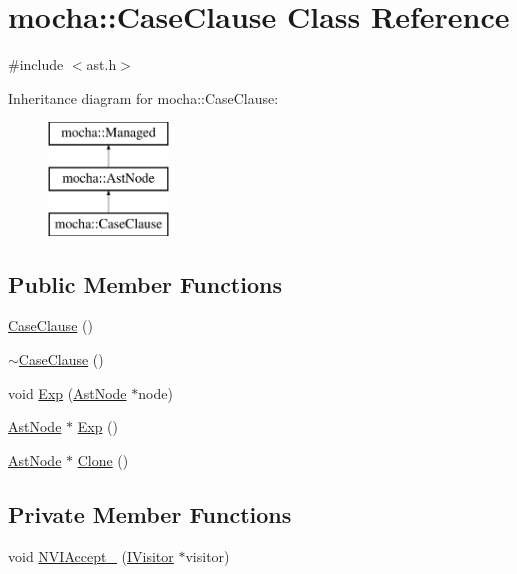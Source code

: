 \hypertarget{classmocha_1_1_case_clause}{
\section{mocha::CaseClause Class Reference}
\label{classmocha_1_1_case_clause}
}


{\ttfamily \#include $<$ast.h$>$}

Inheritance diagram for mocha::CaseClause:\begin{figure}[H]
\begin{center}
\leavevmode
\includegraphics[height=3.000000cm]{classmocha_1_1_case_clause}
\end{center}
\end{figure}
\subsection*{Public Member Functions}
\begin{DoxyCompactItemize}
\item 
\hyperlink{classmocha_1_1_case_clause_a229dfa702d04e78848325f4dc3ab7e9c}{CaseClause} ()
\item 
\hyperlink{classmocha_1_1_case_clause_a7dea944e198694e4011fb950e781ec36}{$\sim$CaseClause} ()
\item 
void \hyperlink{classmocha_1_1_case_clause_abfdb03472b7994732bfaef3f09ba6136}{Exp} (\hyperlink{classmocha_1_1_ast_node}{AstNode} $\ast$node)
\item 
\hyperlink{classmocha_1_1_ast_node}{AstNode} $\ast$ \hyperlink{classmocha_1_1_case_clause_af4d51f44da5f56d9cfbd4ef88b48d31b}{Exp} ()
\item 
\hyperlink{classmocha_1_1_ast_node}{AstNode} $\ast$ \hyperlink{classmocha_1_1_case_clause_ac90d4e97b67875347208e98d4abaaf46}{Clone} ()
\end{DoxyCompactItemize}
\subsection*{Private Member Functions}
\begin{DoxyCompactItemize}
\item 
void \hyperlink{classmocha_1_1_case_clause_ac4cf86a50fb89dd213aafa983a14397a}{NVIAccept\_\-} (\hyperlink{classmocha_1_1_i_visitor}{IVisitor} $\ast$visitor)
\end{DoxyCompactItemize}
